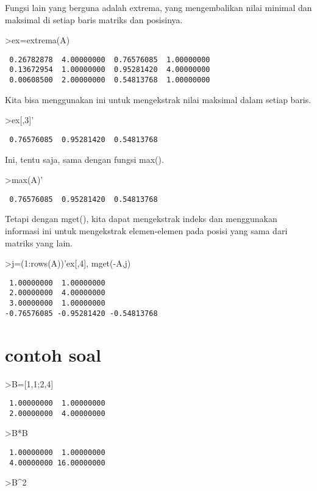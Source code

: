 \documentclass[
]{book}
\begin{document}
Fungsi lain yang berguna adalah extrema, yang mengembalikan nilai minimal dan maksimal di setiap baris matriks dan posisinya.

\textgreater ex=extrema(A)

\begin{verbatim}
 0.26782878  4.00000000  0.76576085  1.00000000 
 0.13672954  1.00000000  0.95281420  4.00000000 
 0.00608500  2.00000000  0.54813768  1.00000000 
\end{verbatim}

Kita bisa menggunakan ini untuk mengekstrak nilai maksimal dalam setiap baris.

\textgreater ex{[},3{]}'

\begin{verbatim}
 0.76576085  0.95281420  0.54813768 
\end{verbatim}

Ini, tentu saja, sama dengan fungsi max().

\textgreater max(A)'

\begin{verbatim}
 0.76576085  0.95281420  0.54813768 
\end{verbatim}

Tetapi dengan mget(), kita dapat mengekstrak indeks dan menggunakan informasi ini untuk mengekstrak elemen-elemen pada posisi yang sama dari matriks yang lain.

\textgreater j=(1:rows(A))'\textbar ex{[},4{]}, mget(-A,j)

\begin{verbatim}
 1.00000000  1.00000000 
 2.00000000  4.00000000 
 3.00000000  1.00000000 
-0.76576085 -0.95281420 -0.54813768 
\end{verbatim}

\section{contoh soal}\label{contoh-soal-9}

\textgreater B={[}1,1;2,4{]}

\begin{verbatim}
 1.00000000  1.00000000 
 2.00000000  4.00000000 
\end{verbatim}

\textgreater B*B

\begin{verbatim}
 1.00000000  1.00000000 
 4.00000000 16.00000000 
\end{verbatim}

\textgreater B\^{}2
\end{document}
